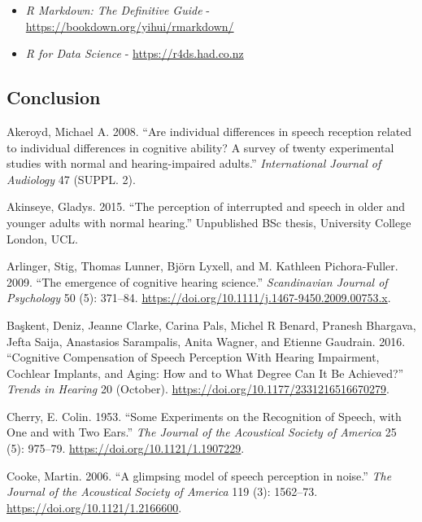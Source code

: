 \documentclass[a4paper,nobind]{templates/ociamthesis}
\begin{document}
\begin{itemize}
\item
  \emph{R Markdown: The Definitive Guide} - \url{https://bookdown.org/yihui/rmarkdown/}
\item
  \emph{R for Data Science} - \url{https://r4ds.had.co.nz}
\end{itemize}

\hypertarget{conclusion}{%
\subsection*{Conclusion}\label{conclusion}}

\hypertarget{refs}{}
\begin{CSLReferences}{1}{0}
\leavevmode\hypertarget{ref-Akeroyd2008}{}%
Akeroyd, Michael A. 2008. {``{Are individual differences in speech reception related to individual differences in cognitive ability? A survey of twenty experimental studies with normal and hearing-impaired adults}.''} \emph{International Journal of Audiology} 47 (SUPPL. 2).

\leavevmode\hypertarget{ref-Akinseye2015}{}%
Akinseye, Gladys. 2015. {``{The perception of interrupted and speech in older and younger adults with normal hearing.}''} Unpublished BSc thesis, University College London, UCL.

\leavevmode\hypertarget{ref-Arlinger2009}{}%
Arlinger, Stig, Thomas Lunner, Björn Lyxell, and M. Kathleen Pichora-Fuller. 2009. {``{The emergence of cognitive hearing science}.''} \emph{Scandinavian Journal of Psychology} 50 (5): 371--84. \url{https://doi.org/10.1111/j.1467-9450.2009.00753.x}.

\leavevmode\hypertarget{ref-Baskent2016}{}%
Başkent, Deniz, Jeanne Clarke, Carina Pals, Michel R Benard, Pranesh Bhargava, Jefta Saija, Anastasios Sarampalis, Anita Wagner, and Etienne Gaudrain. 2016. {``{Cognitive Compensation of Speech Perception With Hearing Impairment, Cochlear Implants, and Aging: How and to What Degree Can It Be Achieved?}''} \emph{Trends in Hearing} 20 (October). \url{https://doi.org/10.1177/2331216516670279}.

\leavevmode\hypertarget{ref-Cherry1953}{}%
Cherry, E. Colin. 1953. {``{Some Experiments on the Recognition of Speech, with One and with Two Ears}.''} \emph{The Journal of the Acoustical Society of America} 25 (5): 975--79. \url{https://doi.org/10.1121/1.1907229}.

\leavevmode\hypertarget{ref-Cooke2006}{}%
Cooke, Martin. 2006. {``{A glimpsing model of speech perception in noise}.''} \emph{The Journal of the Acoustical Society of America} 119 (3): 1562--73. \url{https://doi.org/10.1121/1.2166600}.


\end{CSLReferences}
\end{document}
